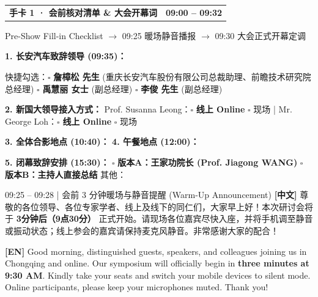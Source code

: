 \documentclass[12pt,a4paper]{article}
\makeatletter
\newcommand{\cardbanner}[3]{%
  \begin{tcolorbox}[
    enhanced, colback=nusnavy, colframe=nusnavy, arc=1.8mm,
    boxrule=0pt, left=3.8mm, right=3.8mm, top=2.1mm, bottom=2.2mm,
    before skip=0pt, after skip=2.4mm,
    borderline south={1.1mm}{0mm}{nusorange}
  ]
    \begin{tabularx}{\linewidth}{@{}X r@{}}
      {\fontsize{13.2}{16}\selectfont\color{white}\textbf{#1}} &
      {\fontsize{11.2}{14}\selectfont\color{orangebg}\textbf{#2}}
    \end{tabularx}
    \vspace{0.6mm}
    {\fontsize{9.3}{11.8}\selectfont\color{slate200}#3}
  \end{tcolorbox}
}
\newcommand{\blankline}[1]{%
  \underline{\hspace{#1}}%
}
\makeatother
\begin{document}
\color{slate900}

\cardbanner{手卡 1 · 会前核对清单 \& 大会开幕词}{09:00 – 09:32}{Pre-Show Fill-in Checklist $\rightarrow$ 09:25 暖场静音播报 $\rightarrow$ 09:30 大会正式开幕定调}

\begin{tcolorbox}[
  enhanced, colback=orangebg, colframe=nusorange, arc=1.4mm, boxrule=0.8pt,
  left=3.4mm, right=3.4mm, top=1.9mm, bottom=1.9mm,
  title={\fontsize{10.5}{12.8}\selectfont\bfseries 09:20 前与会务组手写核对 5 项关键信息 (Pre-Show Write-In)},
  colbacktitle=nusorange, coltitle=white, toptitle=1.3mm, bottomtitle=1.3mm
]
\fontsize{10.6}{15.8}\selectfont
\textbf{1. 长安汽车致辞领导 (09:35)：} \blankline{76mm}\par
{\fontsize{9.4}{13.4}\selectfont\color{slate700}快捷勾选：$\square$ \textbf{詹樟松 先生} (重庆长安汽车股份有限公司总裁助理、前瞻技术研究院总经理) \; $\square$ \textbf{禹慧丽 女士} (副总经理) \; $\square$ \textbf{李俊 先生} (副总经理)}\par
\vspace{0.8mm}
\textbf{2. 新国大领导接入方式：}
Prof. Susanna Leong：$\square$ \textbf{线上 Online} \; $\square$ 现场 \quad|\quad
Mr. George Loh：$\square$ \textbf{线上 Online} \; $\square$ 现场\par
\vspace{0.8mm}
\textbf{3. 全体合影地点 (10:40)：} \blankline{48mm} \quad
\textbf{4. 午餐地点 (12:00)：} \blankline{46mm}\par
\vspace{0.8mm}
\textbf{5. 闭幕致辞安排 (15:30)：} $\square$ \textbf{版本A：王家功院长 (Prof. Jiagong WANG)} \quad $\square$ \textbf{版本B：主持人直接总结} \quad 其他：\blankline{24mm}
\end{tcolorbox}

\begin{transbox}{09:25 – 09:28 \;|\; 会前 3 分钟暖场与静音提醒 (Warm-Up Announcement)}
\fontsize{11.5}{16.8}\selectfont
\textbf{[中文]} 尊敬的各位领导、各位专家学者、线上及线下的同仁们，大家早上好！本次研讨会将于 \textbf{3分钟后（9点30分）} 正式开始。请现场各位嘉宾尽快入座，并将手机调至静音或振动状态；线上参会的嘉宾请保持麦克风静音。非常感谢大家的配合！\par
\vspace{1mm}
\textbf{[EN]} Good morning, distinguished guests, speakers, and colleagues joining us in Chongqing and online. Our symposium will officially begin in \textbf{three minutes at 9:30 AM}. Kindly take your seats and switch your mobile devices to silent mode. Online participants, please keep your microphones muted. Thank you!
\end{transbox}
\end{document}
